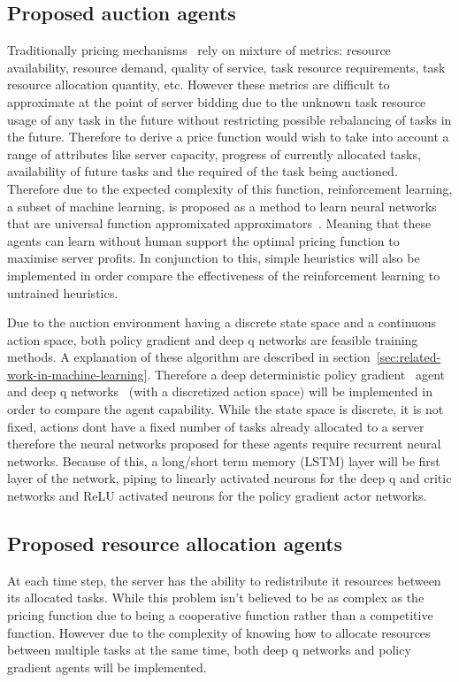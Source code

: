 \subsection{Proposed auction agents}\label{subsec:proposed-auction-agents}
Traditionally pricing mechanisms~\citep{al2013cloud} rely on mixture of metrics: resource availability, resource demand,
quality of service, task resource requirements, task resource allocation quantity, etc. However these metrics are
difficult to approximate at the point of server bidding due to the unknown task resource usage of any task in the
future without restricting possible rebalancing of tasks in the future. Therefore to derive a price function would wish
to take into account a range of attributes like server capacity, progress of currently allocated tasks, availability
of future tasks and the required of the task being auctioned. Therefore due to the expected complexity of this function,
reinforcement learning, a subset of machine learning, is proposed as a method to learn neural networks that are
universal function appromixated approximators~\citep{csaji2001approximation}. Meaning that these agents can learn
without human support the optimal pricing function to maximise server profits. In conjunction to this, simple
heuristics will also be implemented in order compare the effectiveness of the reinforcement learning to untrained
heuristics.

Due to the auction environment having a discrete state space and a continuous action space, both policy gradient and
deep q networks are feasible training methods. A explanation of these algorithm are described in
section~\ref{sec:related-work-in-machine-learning}. Therefore a deep deterministic policy gradient~\citep{ddpg}
agent and deep q networks~\cite{atari} (with a discretized action space) will be implemented in order to compare the
agent capability. While the state space is discrete, it is not fixed, actions dont have a fixed number of tasks
already allocated to a server therefore the neural networks proposed for these agents require recurrent neural networks.
Because of this, a long/short term memory (LSTM) layer will be first layer of the network, piping to linearly
activated neurons for the deep q and critic networks and ReLU activated neurons for the policy gradient actor networks.

\subsection{Proposed resource allocation agents}\label{subsec:proposed-resource-allocation-agents}
At each time step, the server has the ability to redistribute it resources between its allocated tasks. While this
problem isn't believed to be as complex as the pricing function due to being a cooperative function rather than a
competitive function. However due to the complexity of knowing how to allocate resources between multiple tasks at the
same time, both deep q networks and policy gradient agents will be implemented.

